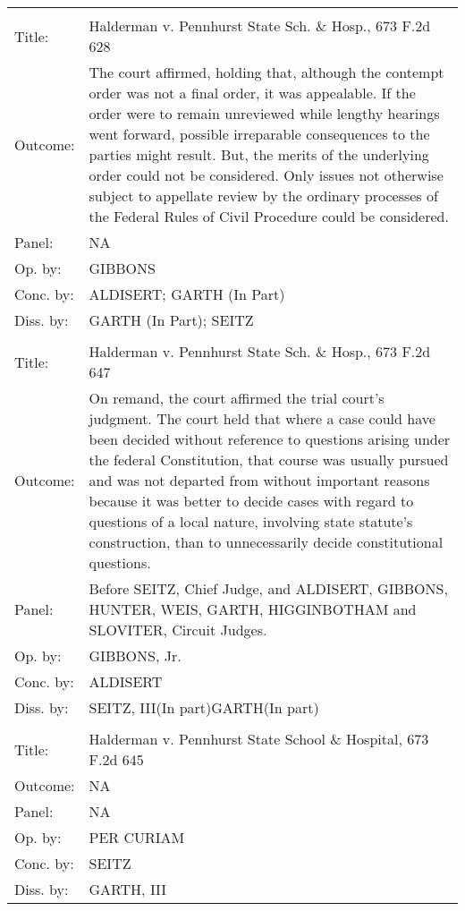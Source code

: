 \documentclass[10pt, letterpaper]{article}
\begin{document}
\begin{spacing}{1.0}
\begin{footnotesize}
\begin{longtable}[H]{lp{6in}}
        \arrayrulecolor{black}\hline\\[-4pt]
        Title: & Halderman v. Pennhurst State Sch. \& Hosp., 673 F.2d 628\\[2pt]
        Outcome: & The court affirmed, holding that, although the contempt order was not a final order, it was appealable. If the order were to remain unreviewed while lengthy hearings went forward, possible irreparable consequences to the parties might result. But, the merits of the underlying order could not be considered. Only issues not otherwise subject to appellate review by the ordinary processes of the Federal Rules of Civil Procedure could be considered.\\[2pt]
        Panel: & NA\\[2pt]
        Op. by: & GIBBONS \\[2pt]
        Conc. by: & ALDISERT; GARTH (In Part) \\[2pt]
        Diss. by: & GARTH (In Part); SEITZ \\[2pt]
        \arrayrulecolor{gray}\hline\\[-4pt]
        Title: & Halderman v. Pennhurst State Sch. \& Hosp., 673 F.2d 647\\[2pt]
        Outcome: & On remand, the court affirmed the trial court's judgment. The court held that where a case could have been decided without reference to questions arising under the federal Constitution, that course was usually pursued and was not departed from without important reasons because it was better to decide cases with regard to questions of a local nature, involving state statute's construction, than to unnecessarily decide constitutional questions.\\[2pt]
        Panel: & Before SEITZ, Chief Judge, and ALDISERT, GIBBONS, HUNTER, WEIS, GARTH, HIGGINBOTHAM and SLOVITER, Circuit Judges.  \\[2pt]
        Op. by: & GIBBONS, Jr. \\[2pt]
        Conc. by: & ALDISERT \\[2pt]
        Diss. by: & SEITZ, III(In part)GARTH(In part) \\[2pt]
        \arrayrulecolor{gray}\hline\\[-4pt]
        Title: & Halderman v. Pennhurst State School \& Hospital, 673 F.2d 645\\[2pt]
        Outcome: & NA\\[2pt]
        Panel: & NA\\[2pt]
        Op. by: & PER CURIAM \\[2pt]
        Conc. by: & SEITZ \\[2pt]
        Diss. by: & GARTH, III \\[2pt]
        

\end{longtable}
\end{footnotesize}
\end{spacing}
\end{document}

